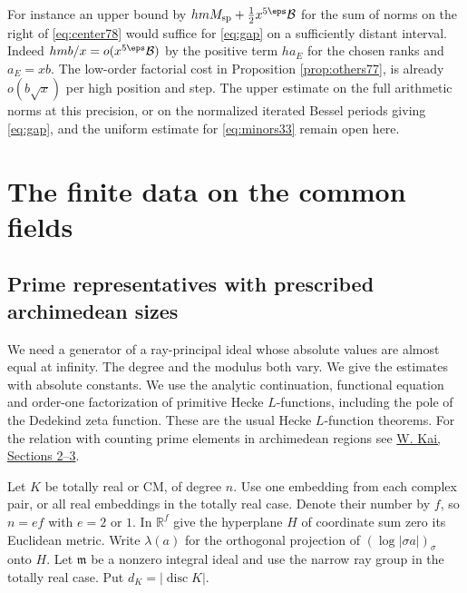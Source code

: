 \documentclass[a4paper,11pt]{article}
\theoremstyle{definition}
\theoremstyle{remark}
\newcommand{\RR}{\mathbb R}\newcommand{\CC}{\mathbb C}\newcommand{\QQ}{\mathbb Q}
\numberwithin{equation}{section}
\begin{document}
For instance an upper bound by \(hm M_{\rm sp}+
\tfrac12 x^{5\eps}\mathcal B\) for the sum of norms on the right
of \eqref{eq:center78} would suffice for \eqref{eq:gap} on a
sufficiently distant interval. Indeed \(hmb/x=o(x^{5\eps}\mathcal B)\)
by the positive term \(h a_E\) for the chosen ranks and \(a_E=xb\).
The low-order factorial cost in Proposition \ref{prop:others77}, is
already \(o(b\sqrt x)\) per high position and step. The upper
estimate on the full arithmetic norms at this precision, or on
the normalized iterated Bessel periods giving \eqref{eq:gap},
and the uniform estimate for \eqref{eq:minors33} remain open here.

\section{The finite data on the common fields}\label{nav:g-I-3}

\subsection{Prime representatives with prescribed archimedean sizes}\label{nav:III-34}
We need a generator of a ray-principal ideal whose absolute values
are almost equal at infinity. The degree and the modulus both vary.
We give the estimates with absolute constants. We use the analytic
continuation, functional equation and order-one factorization of
primitive Hecke \(L\)-functions, including the pole of the Dedekind
zeta function. These are the usual Hecke \(L\)-function theorems.
For the relation with counting prime elements in archimedean regions
see \href{https://arxiv.org/abs/2209.11816}{W. Kai, Sections 2--3}.

Let \(K\) be totally real or CM, of degree \(n\). Use one embedding
from each complex pair, or all real embeddings in the totally real
case. Denote their number by \(f\), so \(n=ef\) with \(e=2\) or \(1\).
In \(\RR^f\) give the hyperplane \(H\) of coordinate sum zero its
Euclidean metric. Write \(\lambda(a)\) for the orthogonal projection
of \((\log|\sigma a|)_\sigma\) onto \(H\). Let \(\mathfrak m\) be a
nonzero integral ideal and use the narrow ray group in the totally
real case. Put \(d_K=|\operatorname{disc}K|\).
\end{document}
